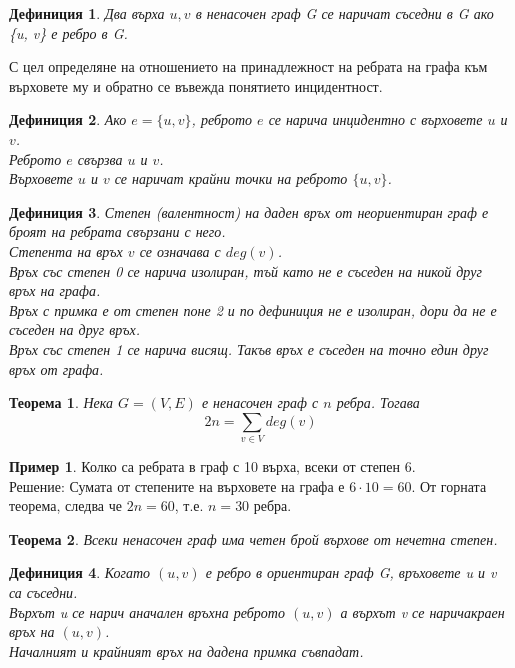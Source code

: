 \documentclass[fleqn, 12pt]{article}
\newtheorem{definition}{Дефиниция}[subsection]
\newtheorem{theorem}{Теорема}[subsection]
\theoremstyle{definition}
\newtheorem{example}{Пример}[subsection]
\begin{document}
\begin{definition}
Два върха $u, v$ в ненасочен граф G се наричат съседни в G ако \{u, v\} е ребро в G.
\end{definition}
С цел определяне на отношението на принадлежност на ребрата на графа към върховете му и обратно се въвежда понятието инцидентност.
\begin{definition}
Ако $e = \{u, v\}$, реброто $e$ се нарича инцидентно с върховете $u$ и $v$. \\
Реброто $e$ свързва $u$ и $v$.\\
Върховете $u$ и $v$ се наричат крайни точки на реброто $\{u, v\}$.
\end{definition}

\begin{definition}
Степен (валентност) на даден връх от неориентиран граф е броят на ребрата свързани с него.\\
Степента на връх $v$ се означава с $deg(v)$.\\
Връх със степен 0 се нарича изолиран, тъй като не е съседен на никой друг връх на графа. \\
Връх с примка е от степен поне 2 и по дефиниция не е изолиран, дори да не е съседен на друг връх.\\
Връх със степен 1 се нарича висящ. Такъв връх е съседен на точно един друг връх от графа.
\end{definition}

\begin{theorem}
Нека $G = (V, E)$ е ненасочен граф с $n$ ребра. Тогава
$$2n = \sum_{v\in V} deg(v)$$
\end{theorem}

\begin{example}
Колко са ребрата в граф с 10 върха, всеки от степен 6.\\
Решение: Сумата от степените на върховете на графа е $6 \cdot 10 = 60$. От горната теорема, следва че $2n = 60$, т.е. $n=30$ ребра.
\end{example}

\begin{theorem}
Всеки ненасочен граф има четен брой върхове от нечетна степен. 
\end{theorem}

\begin{definition}
Когато $(u, v)$ е ребро в ориентиран граф G, връховете u и v са съседни. \\
Върхът u се нарич аначален връхна реброто $(u, v)$ а върхът v се наричакраен връх на $(u, v)$.\\
Началният и крайният връх на дадена примка съвпадат. 
\end{definition}
\end{document}
